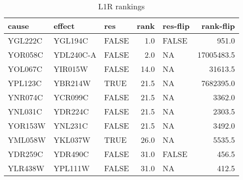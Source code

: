 \begin{table}

\caption{L1R rankings  \label{tab:L1R-ranks}}
\centering
\begin{tabular}[t]{lllrlr}
\toprule
cause & effect & res & rank & res-flip & rank-flip\\
\midrule
YGL222C & YGL194C & FALSE & 1.0 & FALSE & 951.0\\
YOR058C & YDL240C-A & FALSE & 2.0 & NA & 17005483.5\\
YOL067C & YIR015W & FALSE & 14.0 & NA & 31613.5\\
YPL123C & YBR214W & TRUE & 21.5 & NA & 7682395.0\\
YNR074C & YCR099C & FALSE & 21.5 & NA & 3362.0\\
\addlinespace
YNL031C & YDR224C & FALSE & 21.5 & NA & 2303.5\\
YOR153W & YNL231C & FALSE & 21.5 & NA & 3492.0\\
YML058W & YKL037W & TRUE & 26.0 & NA & 5535.5\\
YDR259C & YDR490C & FALSE & 31.0 & FALSE & 456.5\\
YLR438W & YPL111W & FALSE & 31.0 & NA & 412.5\\
\bottomrule
\end{tabular}
\end{table}
